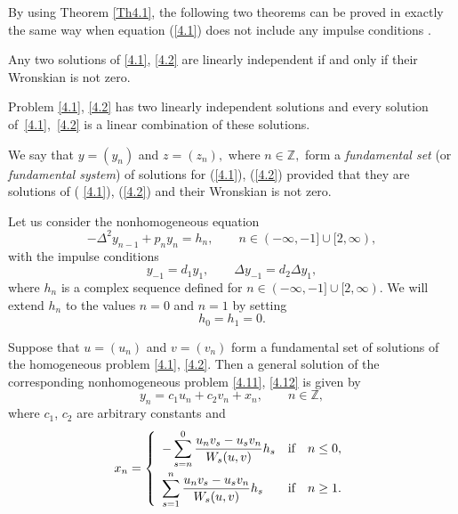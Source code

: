 By using Theorem \ref{Th4.1}, the following two theorems can be proved in
exactly the same way when equation (\ref{4.1}) does not include any impulse
conditions \cite{[6]}.

\begin{theorem}
\label{Th4.5}Any two solutions of \eqref{4.1}, \eqref{4.2} are linearly
independent if and only if their Wronskian is not zero.
\end{theorem}

\begin{theorem}
\label{Th4.6}Problem \eqref{4.1}, \eqref{4.2} has two linearly independent
solutions and every solution of~\eqref{4.1},~\eqref{4.2} is a linear
combination of these solutions.
\end{theorem}

We say that $y=(y_{n})$ and $z=(z_{n}),$ where $n\in
\mathbb{Z}
,$ form a \textit{fundamental set }(or \textit{fundamental system}) of
solutions for (\ref{4.1}), (\ref{4.2}) provided that they are solutions of (%
\ref{4.1}), (\ref{4.2}) and their Wronskian is not zero.

Let us consider the nonhomogeneous equation%
\begin{equation}
-\Delta ^{2}y_{n-1}+p_{n}y_{n}=h_{n},\qquad n\in (-\infty ,-1]\cup
\lbrack 2,\infty ),  \label{4.11}
\end{equation}%
with the impulse conditions%
\begin{equation}
y_{-1}=d_{1}y_{1},\qquad \Delta y_{-1}=d_{2}\Delta y_{1},  \label{4.12}
\end{equation}%
where $h_{n}$ is a complex sequence def\/ined for $n\in (-\infty ,-1]\cup
\lbrack 2,\infty ).$ We will extend $h_{n}$ to the values $n=0$ and $n=1$ by
setting%
\begin{equation}
h_{0}=h_{1}=0.  \label{4.13}
\end{equation}

\begin{theorem}
\label{Th4.7}Suppose that $u=(u_{n})$ and $v=(v_{n})$ form a fundamental set
of solutions of the homogeneous problem \eqref{4.1}, \eqref{4.2}. Then a
general solution of the corresponding nonhomogeneous problem \eqref{4.11}, \eqref{4.12} is given by%
\[
y_{n}=c_{1}u_{n}+c_{2}v_{n}+x_{n},\qquad n\in
\mathbb{Z},
\]%
where $c_{1}$, $c_{2}$ are arbitrary constants and%
\begin{equation}
x_{n}=\left\{
\begin{array}{lll}
\displaystyle -\sum_{s=n}^{0}\frac{u_{n}v_{s}-u_{s}v_{n}}{W_{s}(u,v)}h_{s} & \text{if} &
n\leq 0, \vspace{1mm} \\
\displaystyle \sum_{s=1}^{n}\frac{u_{n}v_{s}-u_{s}v_{n}}{W_{s}(u,v)}h_{s} & \text{if} &
n\geq 1.%
\end{array}%
\right.  \label{4.14}
\end{equation}
\end{theorem}

